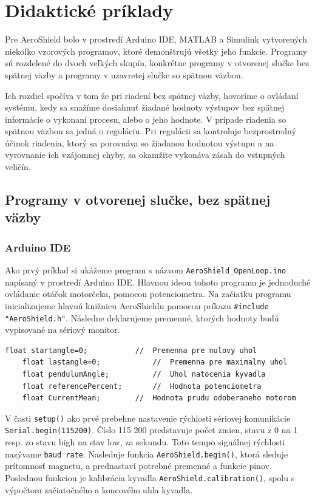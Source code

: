 \chapter{Didaktické príklady}
\label{Didaktické príklady}

Pre AeroShield bolo v prostredí Arduino IDE, MATLAB a Simulink vytvorených niekoľko vzorových programov, ktoré demonštrujú všetky jeho funkcie. Programy sú rozdelené do dvoch veľkých skupín, konkrétne programy v otvorenej slučke bez spätnej väzby a programy v uzavretej slučke so spätnou väzbou. 

Ich rozdiel spočíva v tom že pri riadení bez spätnej väzby, hovoríme o ovládaní systému, kedy sa snažíme dosiahnuť žiadané hodnoty výstupov bez spätnej informácie o vykonaní procesu, alebo o jeho hodnote. V prípade riadenia so spätnou väzbou sa jedná o reguláciu. Pri regulácii sa kontroluje bezprostredný účinok riadenia, ktorý sa porovnáva so žiadanou hodnotou výstupu a na vyrovnanie ich vzájomnej chyby, sa okamžite vykonáva zásah do vstupných veličín. 

\section{Programy v otvorenej slučke, bez spätnej väzby}
\subsection{Arduino IDE}
\label{bezspatnej}

Ako prvý príklad si ukážeme program s názvom \verb|AeroShield_OpenLoop.ino| napísaný v prostredí Arduino IDE. Hlavnou ideou tohoto programu je jednoduché ovládanie otáčok motorčeka, pomocou potenciometra. Na začiatku programu inicializujeme hlavnú knižnicu AeroShieldu pomocou príkazu \verb|#include "AeroShield.h"|. Následne deklarujeme premenné, ktorých hodnoty budú vypisované na sériový monitor. 

\begin{lstlisting}[caption={AeroShield open loop dekleracia.},captionpos=b]
	float startangle=0;           //  Premenna pre nulovy uhol
	float lastangle=0;            //  Premenna pre maximalny uhol 
	float pendulumAngle;          //  Uhol natocenia kyvadla
	float referencePercent;       //  Hodnota potenciometra
	float CurrentMean;	      //  Hodnota prudu odoberaneho motorom 
\end{lstlisting}

V časti \verb|setup()| ako prvé prebehne nastavenie rýchlosti sériovej komunikácie \verb|Serial.begin(115200)|. Číslo 115 200 predstavuje počet zmien, stavu z 0 na 1 resp. zo stavu high na stav low, za sekundu. Toto tempo signálnej rýchlosti nazývame \verb|baud rate|. Nasleduje funkcia \verb|AeroShield.begin()|, ktorá sleduje prítomnosť magnetu, a prednastaví potrebné premenné a funkcie pinov. Poslednou funkciou je kalibrácia kyvadla \verb|AeroShield.calibration()|, spolu s výpočtom začiatočného a koncového uhla kyvadla. 

